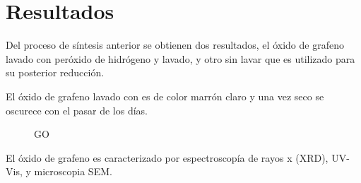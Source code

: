\section{Resultados}
Del proceso de síntesis anterior se obtienen dos resultados, el óxido de grafeno lavado con peróxido de hidrógeno y lavado, y otro sin lavar que es utilizado para su posterior reducción.

El óxido de grafeno lavado con  es de color marrón claro y una vez seco se oscurece con el pasar de los días.

\begin{figure}
	\centering
	\caption{GO}
	\label{fig:GO}
\end{figure}

El óxido de grafeno es caracterizado por espectroscopía de rayos x (XRD), UV-Vis, y microscopia SEM.

